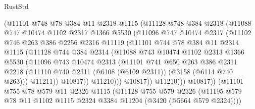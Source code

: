 \begin{lexlean}{RustStd}
\begin{coremodule}
                (@11101
                  @748
                  @78
                  @384
                  @11
                  @2318
                  @1115
                  (@11128
                    @748
                    @384
                    @2318
                    (@11088
                      @747
                      @10474
                      @1102
                      @2317
                      @1366
                      @5530
                      (@11096
                        @747
                        @10474
                        @2317
                        (@11102
                          @746
                          @263
                          @386
                          @2256
                          @2316
                          @11119
                          (@11101
                            @744
                            @78
                            @384
                            @11
                            @2314
                            @1115
                            (@11128
                              @744
                              @384
                              @2314
                              (@11088
                                @743
                                @10474
                                @1102
                                @2313
                                @1366
                                @5530
                                (@11096
                                  @743
                                  @10474
                                  @2313
                                  (@11101
                                    @741
                                    @650
                                    @263
                                    @386
                                    @2311
                                    @2218
                                    (@11110
                                      @740
                                      @2311
                                      (@6108 (@6109 @2311))
                                      (@3158 (@6114 @740 @263)))
                                    @11211))
                                @10817))
                            @11210)))
                      @10817))
                  @11210)))
            @10817))
        (@11101
          @755
          @78
          @579
          @11
          @2326
          @1115
          (@11128
            @755
            @579
            @2326
            (@11195 @579 @78 @11 @1102 @1115 @2324 @3384 @11204 (@3420 (@5664 @579 @2324))))

\end{coremodule}
\end{lexlean}

